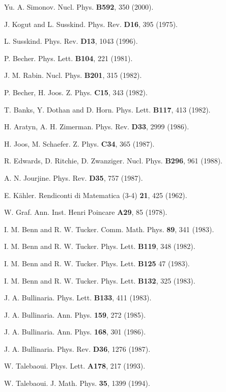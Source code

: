 \documentclass[a4paper,12pt]{article}
\begin{document}
\begin{thebibliography}{99}
\bibitem{}  Yu. A. Simonov. Nucl. Phys. \textbf{B592}, 350 (2000).

\bibitem{}  J. Kogut and L. Susskind. Phys. Rev. \textbf{D16}, 395 (1975).

\bibitem{}  L. Susskind. Phys. Rev. \textbf{D13}, 1043 (1996).

\bibitem{}  P. Becher. Phys. Lett. \textbf{B104}, 221 (1981).

\bibitem{}  J. M. Rabin. Nucl. Phys. \textbf{B201}, 315 (1982).

\bibitem{}  P. Becher, H. Joos. Z. Phys. \textbf{C15}, 343 (1982).

\bibitem{}  T. Banks, Y. Dothan and D. Horn. Phys. Lett.
\textbf{B117}, 413 (1982).

\bibitem{}  H. Aratyn, A. H. Zimerman. Phys. Rev. \textbf{D33}, 2999 (1986).

\bibitem{}  H. Joos, M. Schaefer. Z. Phys. \textbf{C34}, 365 (1987).

\bibitem{}  R. Edwards, D. Ritchie, D. Zwanziger. Nucl. Phys. \textbf{
B296}, 961 (1988).

\bibitem{}  A. N. Jourjine. Phys. Rev. \textbf{D35}, 757 (1987).

\bibitem{}  E. K\"ahler. Rendiconti di Matematica (3-4) \textbf{21}, 425
(1962).

\bibitem{}  W. Graf. Ann. Inst. Henri Poincare \textbf{A29}, 85 (1978).

\bibitem{}  I. M. Benn and R. W. Tucker. Comm. Math. Phys.
\textbf{89}, 341 (1983).

\bibitem{}  I. M. Benn and R. W. Tucker. Phys. Lett. \textbf{B119},
348 (1982).

\bibitem{}  I. M. Benn and R. W. Tucker. Phys. Lett. \textbf{B125} 47 (1983).

\bibitem{}  I. M. Benn and R. W. Tucker. Phys. Lett. \textbf{B132},
325 (1983).

\bibitem{}  J. A. Bullinaria. Phys. Lett. \textbf{B133}, 411 (1983).

\bibitem{}  J. A. Bullinaria. Ann. Phys. \textbf{159}, 272 (1985).

\bibitem{}  J. A. Bullinaria. Ann. Phys. \textbf{168}, 301 (1986).

\bibitem{}  J. A. Bullinaria. Phys. Rev. \textbf{D36}, 1276 (1987).

\bibitem{}  W. Talebaoui. Phys. Lett. \textbf{A178}, 217 (1993).

\bibitem{}  W. Talebaoui. J. Math. Phys. \textbf{35}, 1399 (1994).


\end{thebibliography}
\end{document}
